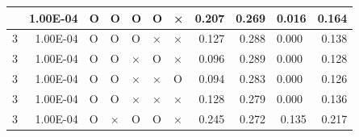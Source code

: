 \documentclass[11pt]{article}
\begin{document}
\begin{longtable}[h]{|r|r|l|l|l|l|l|r|r|l|r|}
\hline
\endlastfoot
3                                 & 1.00E-04                         & O                                & O                                & O                                & O                                & ×                                 & 0.207                             & 0.269                             & \multicolumn{1}{r|}{0.016}         & 0.164                               \\ \hline
3                                 & 1.00E-04                         & O                                & O                                & O                                & ×                                & ×                                 & 0.127                             & 0.288                             & 0.000                              & 0.138                               \\ \hline
3                                 & 1.00E-04                         & O                                & O                                & ×                                & O                                & ×                                 & 0.096                             & 0.289                             & 0.000                              & 0.128                               \\ \hline
3                                 & 1.00E-04                         & O                                & O                                & ×                                & ×                                & O                                 & 0.094                             & 0.283                             & 0.000                              & 0.126                               \\ \hline
3                                 & 1.00E-04                         & O                                & O                                & ×                                & ×                                & ×                                 & 0.128                             & 0.279                             & 0.000                              & 0.136                               \\ \hline
3                                 & 1.00E-04                         & O                                & ×                                & O                                & O                                & ×                                 & 0.245                             & 0.272                             & \multicolumn{1}{r|}{0.135}         & 0.217                               \\ \hline

\end{longtable}
\end{document}

